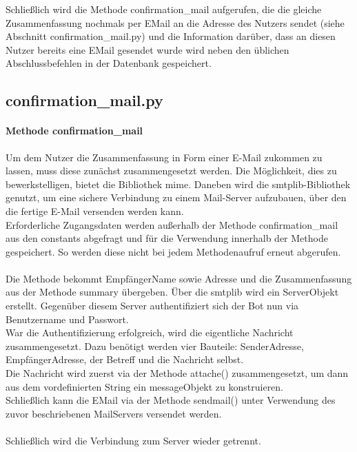             Schließlich wird die Methode confirmation\_mail aufgerufen, die die gleiche Zusammenfassung nochmals per E\-Mail an die Adresse des Nutzers sendet (siehe Abschnitt confirmation\_mail.py) und die Information darüber, dass an diesen Nutzer bereits eine E\-Mail gesendet wurde wird neben den üblichen Abschlussbefehlen in der Datenbank gespeichert.

                    
        \subsection{confirmation\_mail.py}
            \paragraph{Methode confirmation\_mail}
                Um dem Nutzer die Zusammenfassung in Form einer E-Mail zukommen zu lassen, muss diese zunächst zusammengesetzt werden. Die Möglichkeit, dies zu bewerkstelligen, bietet die Bibliothek mime. \cite{email.mime} Daneben wird die smtplib-Bibliothek genutzt, um eine sichere Verbindung zu einem Mail-Server aufzubauen, über den die fertige E-Mail versenden werden kann. \cite{smtplib}\\

                Erforderliche Zugangsdaten werden außerhalb der Methode confirmation\_mail aus den constants abgefragt und für die Verwendung innerhalb der Methode gespeichert. So werden diese nicht bei jedem Methodenaufruf erneut abgerufen.\\
                \\
                Die Methode bekommt Empfänger\-Name sowie \-Adresse und die Zusammenfassung aus der Methode summary übergeben. Über die smtplib wird ein Server\-Objekt erstellt. Gegenüber diesem Server authentifiziert sich der Bot nun via Benutzername und Passwort.\\
                War die Authentifizierung erfolgreich, wird die eigentliche Nachricht zusammengesetzt. Dazu benötigt werden vier Bauteile: Sender\-Adresse, Empfänger\-Adresse, der Betreff und die Nachricht selbst.\\
                Die Nachricht wird zuerst via der Methode attache() zusammengesetzt, um dann aus dem vordefinierten String ein message\-Objekt zu konstruieren.\\
                Schließlich kann die E\-Mail via der Methode sendmail() unter Verwendung des zuvor beschriebenen Mail\-Servers versendet werden.\\
                \\
                Schließlich wird die Verbindung zum Server wieder getrennt.



